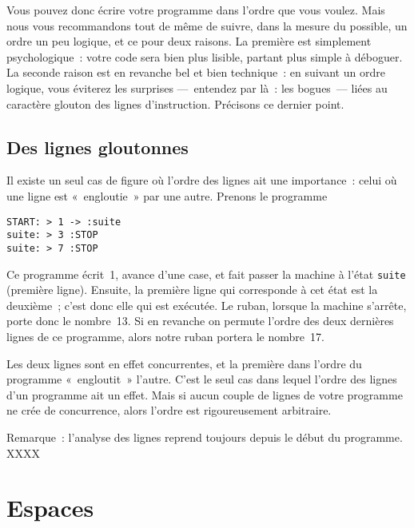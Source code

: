 \documentclass[a4paper, 11pt]{report}
\begin{document}
\par

Vous pouvez donc écrire votre programme dans l'ordre que vous
voulez. Mais nous vous recommandons tout de même de suivre, dans la
mesure du possible, un ordre un peu logique, et ce pour deux raisons. La
première est simplement psychologique~: votre code sera bien plus
lisible, partant plus simple à déboguer. La seconde raison est en
revanche bel et bien technique~: en suivant un ordre logique, vous
éviterez les surprises ---~entendez par là~: les bogues~--- liées au
caractère glouton des lignes d'instruction. Précisons ce dernier point. 


\subsection{Des lignes gloutonnes}

Il existe un seul cas de figure où l'ordre des lignes ait une
importance~: celui où une ligne est «~engloutie~» par une autre. Prenons
le programme

\begin{verbatim}
START: > 1 -> :suite
suite: > 3 :STOP
suite: > 7 :STOP
\end{verbatim}

Ce programme écrit~1, avance d'une case, et fait passer la machine à
l'état \texttt{suite} (première ligne). Ensuite, la première ligne qui
corresponde à cet état est la deuxième~; c'est donc elle qui est
exécutée. Le ruban, lorsque la machine s'arrête, porte donc le
nombre~13. Si en revanche on permute l'ordre des deux dernières lignes
de ce programme, alors notre ruban portera le nombre~17.

\par

Les deux lignes sont en effet concurrentes, et la première dans l'ordre
du programme «~engloutit~» l'autre. C'est le seul cas dans lequel
l'ordre des lignes d'un programme ait un effet. Mais si aucun couple de
lignes de votre programme ne crée de concurrence, alors l'ordre est
rigoureusement arbitraire.

\par

Remarque~: l'analyse des lignes reprend toujours depuis le début du
programme. XXXX



\section{Espaces}
\end{document}
